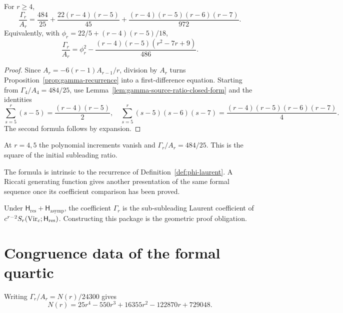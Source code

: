 \begin{theorem}
\label{thm:shadow-tower-sub-subleading-closed-form}
\ClaimStatusProvedHere
For \(r\ge4\),
\[
 \frac{\Gamma_r}{A_r}
 =\frac{484}{25}
 +\frac{22(r-4)(r-5)}{45}
 +\frac{(r-4)(r-5)(r-6)(r-7)}{972}.
\]
Equivalently, with
\(\phi_r=22/5+(r-4)(r-5)/18\),
\[
 \frac{\Gamma_r}{A_r}
 =\phi_r^2-
 \frac{(r-4)(r-5)(r^2-7r+9)}{486}.
\]
\end{theorem}

\begin{proof}
Since \(A_r=-6(r-1)A_{r-1}/r\), division by \(A_r\) turns
Proposition~\ref{prop:gamma-recurrence} into a first-difference
equation.  Starting from \(\Gamma_4/A_4=484/25\), use
Lemma~\ref{lem:gamma-source-ratio-closed-form} and the identities
\[
 \sum_{s=5}^{r}(s-5)=\frac{(r-4)(r-5)}2,
 \quad
 \sum_{s=5}^{r}(s-5)(s-6)(s-7)
 =\frac{(r-4)(r-5)(r-6)(r-7)}4.
\]
The second formula follows by expansion.
\end{proof}

\begin{remark}
\label{rem:gamma-base-case}
At \(r=4,5\) the polynomial increments vanish and
\(\Gamma_r/A_r=484/25\).  This is the square of the initial
subleading ratio.
\end{remark}

\begin{remark}
\label{rem:gamma-riccati-origin}
The formula is intrinsic to the recurrence of
Definition~\ref{def:phi-laurent}.  A Riccati generating function gives
another presentation of the same formal sequence once its coefficient
comparison has been proved.
\end{remark}

\begin{remark}
\ClaimStatusConditional
Under \(\mathsf H_{\mathrm{res}}+\mathsf H_{\mathrm{asymp}}\), the
coefficient \(\Gamma_r\) is the sub-subleading Laurent coefficient of
\(c^{r-2}S_r(\mathrm{Vir}_c;\mathsf H_{\mathrm{res}})\).  Constructing this
package is the geometric proof obligation.
\end{remark}

\section{Congruence data of the formal quartic}
\label{sec:stss-kummer}

\begin{lemma}
\label{lem:gamma-numerator-quartic-polynomial}
\ClaimStatusProvedHere
Writing \(\Gamma_r/A_r=N(r)/24300\) gives
\[
 N(r)=25r^4-550r^3+16355r^2-122870r+729048.
\]
\end{lemma}

